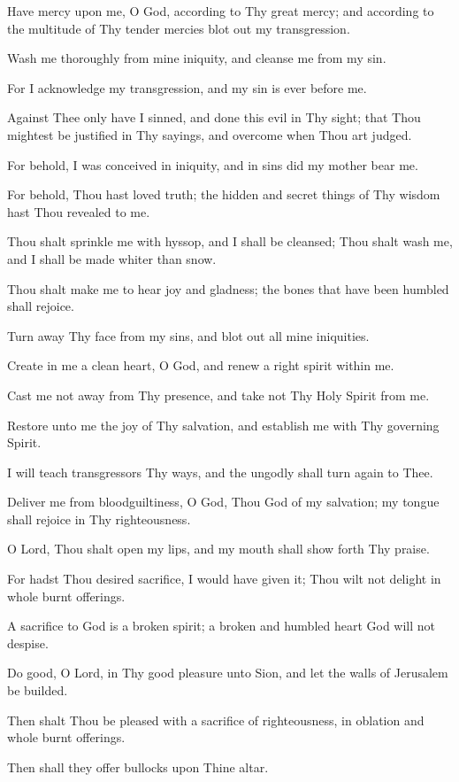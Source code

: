 Have mercy upon me, O God, according to Thy great mercy; and according to the multitude of Thy tender mercies blot out my transgression.

Wash me thoroughly from mine iniquity, and cleanse me from my sin.

For I acknowledge my transgression, and my sin is ever before me.

Against Thee only have I sinned, and done this evil in Thy sight; that Thou mightest be justified in Thy sayings, and overcome when Thou art judged.

For behold, I was conceived in iniquity, and in sins did my mother bear me.

For behold, Thou hast loved truth; the hidden and secret things of Thy wisdom hast Thou revealed to me.

Thou shalt sprinkle me with hyssop, and I shall be cleansed; Thou shalt wash me, and I shall be made whiter than snow.

Thou shalt make me to hear joy and gladness; the bones that have been humbled shall rejoice.

Turn away Thy face from my sins, and blot out all mine iniquities.

Create in me a clean heart, O God, and renew a right spirit within me.

Cast me not away from Thy presence, and take not Thy Holy Spirit from me.

Restore unto me the joy of Thy salvation, and establish me with Thy governing Spirit.

I will teach transgressors Thy ways, and the ungodly shall turn again to Thee.

Deliver me from bloodguiltiness, O God, Thou God of my salvation; my tongue shall rejoice in Thy righteousness.

O Lord, Thou shalt open my lips, and my mouth shall show forth Thy praise.

For hadst Thou desired sacrifice, I would have given it; Thou wilt not delight in whole burnt offerings.

A sacrifice to God is a broken spirit; a broken and humbled heart God will not despise.

Do good, O Lord, in Thy good pleasure unto Sion, and let the walls of Jerusalem be builded.

Then shalt Thou be pleased with a sacrifice of righteousness, in oblation and whole burnt offerings.

Then shall they offer bullocks upon Thine altar.
